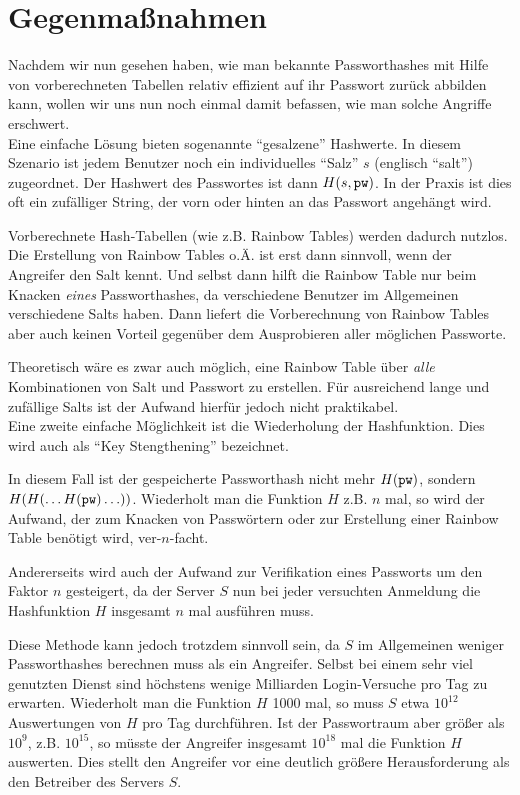 \section{Gegenmaßnahmen}

Nachdem wir nun gesehen haben, wie man bekannte Passworthashes mit Hilfe von vorberechneten Tabellen relativ effizient auf ihr Passwort zurück abbilden kann, wollen wir uns nun noch einmal damit befassen, wie man solche Angriffe erschwert.\\

Eine einfache Lösung bieten sogenannte "`gesalzene"' Hashwerte. In diesem Szenario ist jedem Benutzer noch ein individuelles "`Salz"' $s$ (englisch "`salt"') zugeordnet. Der Hashwert des Passwortes ist dann $H(s, \texttt{pw})$. In der Praxis ist dies oft ein zufälliger String, der vorn oder hinten an das Passwort angehängt wird.

Vorberechnete Hash-Tabellen (wie z.B. Rainbow Tables) werden dadurch nutzlos. Die Erstellung von Rainbow Tables o.Ä. ist erst dann sinnvoll, wenn der Angreifer den Salt kennt. Und selbst dann hilft die Rainbow Table nur beim Knacken \emph{eines} Passworthashes, da verschiedene Benutzer im Allgemeinen verschiedene Salts haben. Dann liefert die Vorberechnung von Rainbow Tables aber auch keinen Vorteil gegenüber dem Ausprobieren aller möglichen Passworte.

Theoretisch wäre es zwar auch möglich, eine Rainbow Table über \emph{alle} Kombinationen von Salt und Passwort zu erstellen. Für ausreichend lange und zufällige Salts ist der Aufwand hierfür jedoch nicht praktikabel.\\

Eine zweite einfache Möglichkeit ist die Wiederholung der Hashfunktion. Dies wird auch als "`Key Stengthening"' bezeichnet.

In diesem Fall ist der gespeicherte Passworthash nicht mehr $H(\texttt{pw})$, sondern $H(H(\ldots H(\texttt{pw})\ldots))$. Wiederholt man die Funktion $H$ z.B. $n$ mal, so wird der Aufwand, der zum Knacken von Passwörtern oder zur Erstellung einer Rainbow Table benötigt wird, ver-$n$-facht.

Andererseits wird auch der Aufwand zur Verifikation eines Passworts um den Faktor $n$ gesteigert, da der Server $S$ nun bei jeder versuchten Anmeldung die Hashfunktion $H$ insgesamt $n$ mal ausführen muss.

Diese Methode kann jedoch trotzdem sinnvoll sein, da $S$ im Allgemeinen weniger Passworthashes berechnen muss als ein Angreifer. Selbst bei einem sehr viel genutzten Dienst sind höchstens wenige Milliarden Login-Versuche pro Tag zu erwarten. Wiederholt man die Funktion $H$ 1000 mal, so muss $S$ etwa $10^{12}$ Auswertungen von $H$ pro Tag durchführen. Ist der Passwortraum aber größer als $10^9$, z.B. $10^{15}$, so müsste der Angreifer insgesamt $10^{18}$ mal die Funktion $H$ auswerten. Dies stellt den Angreifer vor eine deutlich größere Herausforderung als den Betreiber des Servers $S$.

